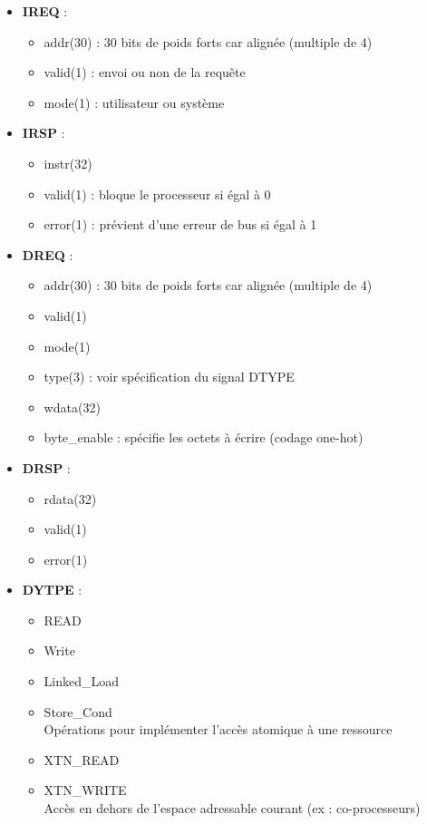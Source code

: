 \begin{itemize}
  \item {\bf IREQ} :\\
  \begin{itemize}
    \item addr(30) : 30 bits de poids forts car alignée (multiple de 4)
    \item valid(1) : envoi ou non de la requête
    \item mode(1) : utilisateur ou système
  \end{itemize}
  \item {\bf IRSP} :\\
  \begin{itemize}
    \item instr(32)
    \item valid(1) : bloque le processeur si égal à 0
    \item error(1) : prévient d'une erreur de bus si égal à 1
  \end{itemize}
  \item {\bf DREQ} :\\
  \begin{itemize}
    \item addr(30) : 30 bits de poids forts car alignée (multiple de 4)
    \item valid(1)
    \item mode(1)
    \item type(3) : voir spécification du signal DTYPE
    \item wdata(32)
    \item byte\_enable : spécifie les octets à écrire (codage one-hot)
  \end{itemize}
  \item {\bf DRSP} :\\
  \begin{itemize}
    \item rdata(32)
    \item valid(1)
    \item error(1)
  \end{itemize}
  \item {\bf DYTPE} :\\
  \begin{itemize}
    \item READ
    \item Write
    \item Linked\_Load
    \item Store\_Cond\\
    Opérations pour implémenter l'accès atomique à une ressource
    \item XTN\_READ
    \item XTN\_WRITE\\
    Accès en dehors de l'espace adressable courant (ex : co-processeurs)
  \end{itemize}
\end{itemize}
